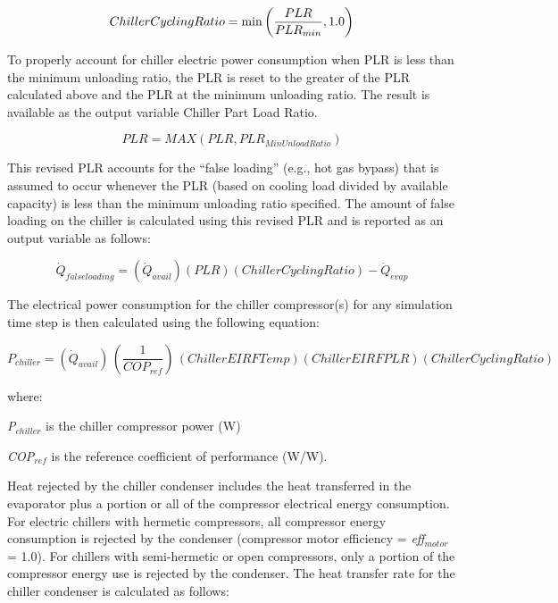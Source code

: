 \begin{equation}
  ChillerCyclingRatio = \min\left(\frac{PLR}{PLR_{min}},1.0\right)
\end{equation}

To properly account for chiller electric power consumption when PLR is less than the minimum unloading ratio, the PLR is reset to the greater of the PLR calculated above and the PLR at the minimum unloading ratio. The result is available as the output variable Chiller Part Load Ratio.

\begin{equation}
PLR = MAX(PLR,PL{R_{MinUnloadRatio}})
\end{equation}

This revised PLR accounts for the ``false loading'' (e.g., hot gas bypass) that is assumed to occur whenever the PLR (based on cooling load divided by available capacity) is less than the minimum unloading ratio specified. The amount of false loading on the chiller is calculated using this revised PLR and is reported as an output variable as follows:

\begin{equation}
{\dot{Q}_{falseloading}} = \left( {{\dot{Q}_{avail}}} \right)\left( {PLR} \right)\left( {ChillerCyclingRatio} \right) - {\dot{Q}_{evap}}
\end{equation}

The electrical power consumption for the chiller compressor(s) for any simulation time step is then calculated using the following equation:

\begin{equation}
{P_{chiller}} = \left( {{\dot{Q}_{avail}}} \right)\,\left( {\frac{1}{{CO{P_{ref}}}}} \right)\,\left( {ChillerEIRFTemp} \right)\left( {ChillerEIRFPLR} \right)\left( {ChillerCyclingRatio} \right)
\end{equation}

where:

\emph{P\(_{chiller}\)} is the chiller compressor power (W)

\emph{COP\(_{ref}\)} is the reference coefficient of performance (W/W).

Heat rejected by the chiller condenser includes the heat transferred in the evaporator plus a portion or all of the compressor electrical energy consumption. For electric chillers with hermetic compressors, all compressor energy consumption is rejected by the condenser (compressor motor efficiency = \emph{eff\(_{motor}\)} = 1.0). For chillers with semi-hermetic or open compressors, only a portion of the compressor energy use is rejected by the condenser. The heat transfer rate for the chiller condenser is calculated as follows:

